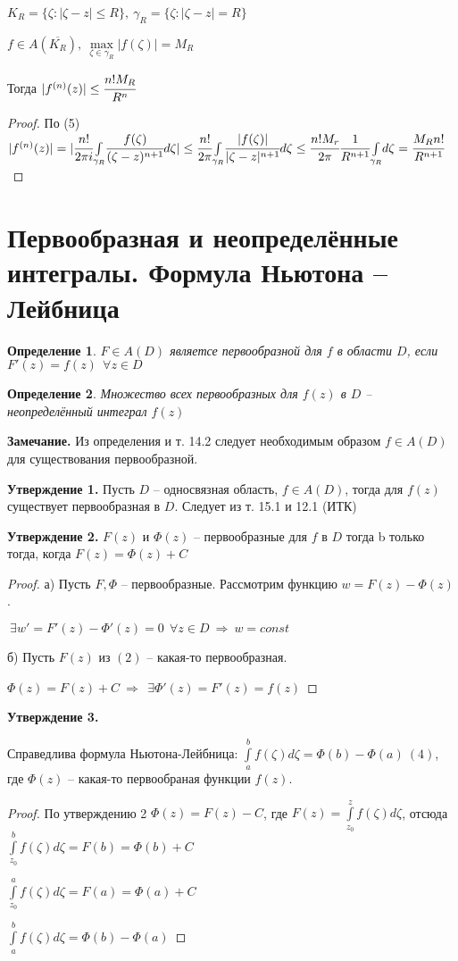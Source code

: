 \documentclass[draft]{article}
\renewcommand{\bf}{\bfseries}
\newcommand{\then}{\ \Rightarrow\ }
\newcommand{\mint}[2]{\underset{#1}{\overset{#2}{\int}}}
\newcommand{\mmax}[1]{\underset{#1}{\max}}
\renewcommand{\bar}{\overline}
\newcommand{\g}{\gamma}
\newcommand{\E}{\ \exists}
\newcommand{\F}{\ \forall}
\newcommand{\opr}[1]{\begin{opred}#1\end{opred}}
\newtheorem*{opred}{Определение}
\theoremstyle{remark}
\begin{document}
$K_R=\{\zeta\colon|\zeta-z|\leq R\},\ \g_R=\{\zeta\colon|\zeta-z|=R\}$

$f\in A(\bar{K_R}),\ \mmax{\zeta\in\g_R}|f(\zeta)|=M_R$

Тогда $|f^{(n)}(z)|\leq\cfrac{n!M_R}{R^n}$
\begin{proof}
По (5) $|f^{(n)}(z)|=|\cfrac{n!}{2\pi i}\mint{\g_R}{}\cfrac{f(\zeta)}{(\zeta-z)^{n+1}}d\zeta|\leq \cfrac {n!}{2\pi}\mint{\g_R}{}\cfrac{|f(\zeta)|}{|\zeta-z|^{n+1}}d\zeta\leq\cfrac{n!M_r}{2\pi}\cfrac1{R^{n+1}}\mint{\g_R}{}d\zeta=\cfrac{M_Rn!}{R^{n+1}}$
\end{proof}

\newpage

\section{Первообразная и неопределённые интегралы. Формула Ньютона -- Лейбница}

\opr{$F\in A(D)$ являетсе первообразной для $f$ в области $D$, если $F'(z)=f(z)\ \F z\in D$}

\opr{Множество всех первообразных для $f(z)$ в $D$ -- неопределённый интеграл $f(z)$}

{\bf Замечание.} Из определения и т. 14.2 следует необходимым образом $f\in A(D)$ для существования первообразной.

{\bf Утверждение 1.} Пусть $D$ -- односвязная область, $f\in A(D)$, тогда для $f(z)$ существует первообразная в $D$. Следует из т. 15.1 и 12.1 (ИТК)

{\bf Утверждение 2.} $F(z)$ и $\Phi(z)$ -- первообразные для $f$ в $D$ тогда b только тогда, когда $F(z)=\Phi(z)+C$
\begin{proof}
а) Пусть $F,\Phi$ -- первообразные. Рассмотрим функцию $w=F(z)-\Phi(z)$.

$\E w'=F'(z)-\Phi'(z)=0\ \F z\in D\then w=const$

б) Пусть $F(z)$ из $(2)$ -- какая-то первообразная.

$\Phi(z)=F(z)+C\then \E \Phi'(z)=F'(z)=f(z)$
\end{proof}

{\bf Утверждение 3.}

Справедлива формула Ньютона-Лейбница:
$\mint{a}{b}f(\zeta)d\zeta=\Phi(b)-\Phi(a)\ (4)$, где $\Phi(z)$ -- какая-то первообраная функции $f(z)$.
\begin{proof}
По утверждению 2 $\Phi(z)=F(z)-C$, где $F(z)=\mint{z_0}{z}f(\zeta)d\zeta$, отсюда $\mint{z_0}{b}f(\zeta)d\zeta=F(b)=\Phi(b)+C$

$\mint{z_0}{a}f(\zeta)d\zeta=F(a)=\Phi(a)+C$

$\mint{a}{b}f(\zeta)d\zeta=\Phi(b)-\Phi(a)$
\end{proof}
\newpage
\end{document}
